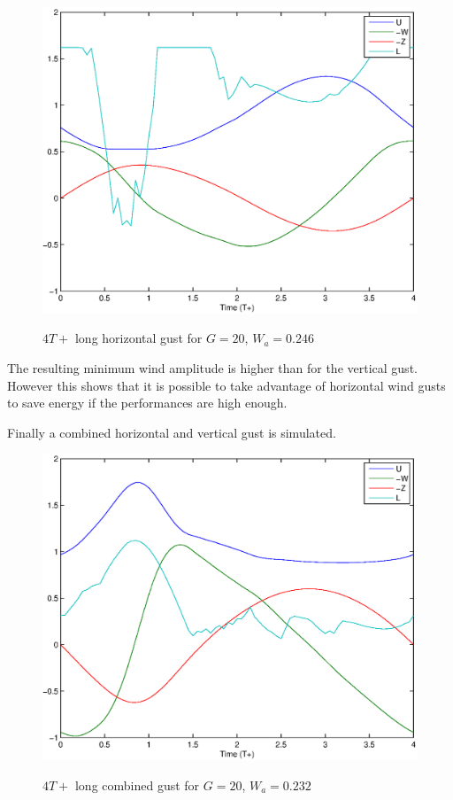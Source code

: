 \begin{figure}[h]
	\begin{center}
		\scalebox{0.8}
		{\includegraphics{./Figures/Windtype=2_Tg=4_Wg=0p246_quad_G=20.eps}}
	\end{center}
	\caption{$4T+$ long horizontal gust for $G=20$, $W_a=0.246$}
	\label{fig:Horizontal_optimization}
\end{figure}

The resulting minimum wind amplitude is higher than for the vertical gust. 
However this shows that it is possible to take advantage of horizontal wind gusts to save energy if the performances are high enough.

\par Finally a combined horizontal and vertical gust is simulated.

\begin{figure}[h]
	\begin{center}
		\scalebox{0.8}
		{\includegraphics{./Figures/Windtype=3_Tg=4_Wg=0p232_quad_G=20.eps}}
	\end{center}
	\caption{$4T+$ long combined gust for $G=20$, $W_a=0.232$}
	\label{fig:combined_optimization}
\end{figure}
  
